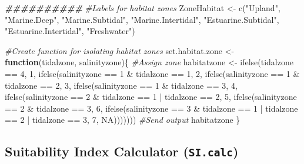 \documentclass[
]{book}
\newenvironment{Shaded}{\begin{snugshade}}{\end{snugshade}}
\newcommand{\CommentTok}[1]{\textcolor[rgb]{0.56,0.35,0.01}{\textit{#1}}}
\newcommand{\ConstantTok}[1]{\textcolor[rgb]{0.00,0.00,0.00}{#1}}
\newcommand{\ControlFlowTok}[1]{\textcolor[rgb]{0.13,0.29,0.53}{\textbf{#1}}}
\newcommand{\DecValTok}[1]{\textcolor[rgb]{0.00,0.00,0.81}{#1}}
\newcommand{\DocumentationTok}[1]{\textcolor[rgb]{0.56,0.35,0.01}{\textbf{\textit{#1}}}}
\newcommand{\FunctionTok}[1]{\textcolor[rgb]{0.00,0.00,0.00}{#1}}
\newcommand{\NormalTok}[1]{#1}
\newcommand{\OtherTok}[1]{\textcolor[rgb]{0.56,0.35,0.01}{#1}}
\newcommand{\SpecialCharTok}[1]{\textcolor[rgb]{0.00,0.00,0.00}{#1}}
\newcommand{\StringTok}[1]{\textcolor[rgb]{0.31,0.60,0.02}{#1}}
\begin{document}
\begin{Shaded}
\begin{Highlighting}[]
\DocumentationTok{\#\#\#\#\#\#\#\#\#\#}
\CommentTok{\#Labels for habitat zones}
\NormalTok{ZoneHabitat }\OtherTok{\textless{}{-}} \FunctionTok{c}\NormalTok{(}\StringTok{"Upland"}\NormalTok{, }\StringTok{"Marine.Deep"}\NormalTok{, }\StringTok{"Marine.Subtidal"}\NormalTok{, }\StringTok{"Marine.Intertidal"}\NormalTok{, }\StringTok{"Estuarine.Subtidal"}\NormalTok{, }\StringTok{"Estuarine.Intertidal"}\NormalTok{, }\StringTok{"Freshwater"}\NormalTok{)}

\CommentTok{\#Create function for isolating habitat zones}
\NormalTok{set.habitat.zone }\OtherTok{\textless{}{-}} \ControlFlowTok{function}\NormalTok{(tidalzone, salinityzone)\{}
  \CommentTok{\#Assign zone}
\NormalTok{  habitatzone }\OtherTok{\textless{}{-}} \FunctionTok{ifelse}\NormalTok{(tidalzone }\SpecialCharTok{==} \DecValTok{4}\NormalTok{, }\DecValTok{1}\NormalTok{,}
          \FunctionTok{ifelse}\NormalTok{(salinityzone }\SpecialCharTok{==} \DecValTok{1} \SpecialCharTok{\&}\NormalTok{ tidalzone }\SpecialCharTok{==} \DecValTok{1}\NormalTok{, }\DecValTok{2}\NormalTok{,}
          \FunctionTok{ifelse}\NormalTok{(salinityzone }\SpecialCharTok{==} \DecValTok{1} \SpecialCharTok{\&}\NormalTok{ tidalzone }\SpecialCharTok{==} \DecValTok{2}\NormalTok{, }\DecValTok{3}\NormalTok{,}
          \FunctionTok{ifelse}\NormalTok{(salinityzone }\SpecialCharTok{==} \DecValTok{1} \SpecialCharTok{\&}\NormalTok{ tidalzone }\SpecialCharTok{==} \DecValTok{3}\NormalTok{, }\DecValTok{4}\NormalTok{,}
          \FunctionTok{ifelse}\NormalTok{(salinityzone }\SpecialCharTok{==} \DecValTok{2} \SpecialCharTok{\&}\NormalTok{ tidalzone }\SpecialCharTok{==} \DecValTok{1} \SpecialCharTok{|}\NormalTok{ tidalzone }\SpecialCharTok{==} \DecValTok{2}\NormalTok{, }\DecValTok{5}\NormalTok{,}
          \FunctionTok{ifelse}\NormalTok{(salinityzone }\SpecialCharTok{==} \DecValTok{2} \SpecialCharTok{\&}\NormalTok{ tidalzone }\SpecialCharTok{==} \DecValTok{3}\NormalTok{, }\DecValTok{6}\NormalTok{,}
          \FunctionTok{ifelse}\NormalTok{(salinityzone }\SpecialCharTok{==} \DecValTok{3} \SpecialCharTok{\&}\NormalTok{ tidalzone }\SpecialCharTok{==} \DecValTok{1} \SpecialCharTok{|}\NormalTok{ tidalzone }\SpecialCharTok{==} \DecValTok{2} \SpecialCharTok{|}\NormalTok{ tidalzone }\SpecialCharTok{==} \DecValTok{3}\NormalTok{, }\DecValTok{7}\NormalTok{, }\ConstantTok{NA}\NormalTok{)))))))}
  \CommentTok{\#Send output}
\NormalTok{  habitatzone}
\NormalTok{\}}
\end{Highlighting}
\end{Shaded}

\hypertarget{suitability-index-calculator-si.calc}{%
\subsection{\texorpdfstring{Suitability Index Calculator (\texttt{SI.calc})}{Suitability Index Calculator (SI.calc)}}\label{suitability-index-calculator-si.calc}}
\end{document}
